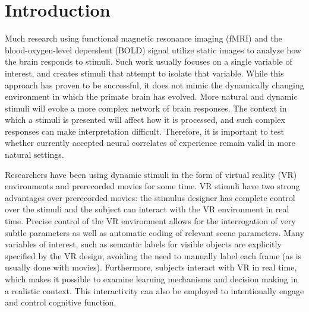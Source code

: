 \documentclass[5p,authoryear]{elsarticle}
\begin{document}
\section{Introduction}
Much research using functional magnetic resonance imaging (fMRI) and the blood-oxygen-level dependent (BOLD) signal utilize static images to analyze how the brain responds to stimuli.
Such work usually focuses on a single variable of interest, and creates stimuli that attempt to isolate that variable.
While this approach has proven to be successful, it does not mimic the dynamically changing environment in which the primate brain has evolved.
More natural and dynamic stimuli will evoke a more complex network of brain responses.
The context in which a stimuli is presented will affect how it is processed, and such complex responses can make interpretation difficult.
Therefore, it is important to test whether currently accepted neural correlates of experience remain valid in more natural settings.

Researchers have been using dynamic stimuli in the form of virtual reality (VR) environments \citep{Maguire1998,Calhoun2002,King2006,Mathiak2006,Spiers2007a,Hassabis2009} and prerecorded movies \citep{Hasson2004,Chadwick2010,Nishimoto2011} for some time.
VR stimuli have two strong advantages over prerecorded movies: the stimulus designer has complete control over the stimuli and the subject can interact with the VR environment in real time.
Precise control of the VR environment allows for the interrogation of very subtle parameters as well as automatic coding of relevant scene parameters.
Many variables of interest, such as semantic labels for visible objects are explicitly specified by the VR design, avoiding the need to manually label each frame (as is usually done with movies).
Furthermore, subjects interact with VR in real time, which makes it possible to examine learning mechanisms and decision making in a realistic context.
This interactivity can also be employed to intentionally engage and control cognitive function.
\end{document}
